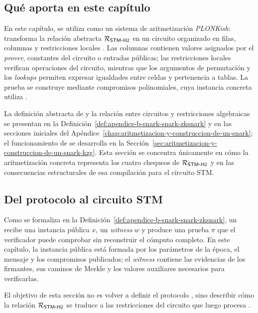 
\subsection{Qué aporta \HaloTwo en este capítulo}
\label{subsec:stm-halo2-y-complejidad-que-aporta-halotwo-en-este-capitulo}

En este capítulo, \HaloTwo se utiliza como un sistema de aritmetización \textit{PLONKish}: transforma la relación abstracta $\mathcal{R}_{\mathsf{STM\mbox{-}H2}}$ en un circuito organizado en filas, columnas y restricciones locales \cite{cryptoeprint:2019/953}. Las columnas contienen valores asignados por el \textit{prover}, constantes del circuito o entradas públicas; las restricciones locales verifican operaciones del circuito, mientras que los argumentos de permutación y los \textit{lookups} permiten expresar igualdades entre celdas y pertenencia a tablas. La prueba se construye mediante compromisos polinomiales, cuya instancia concreta utiliza \KZG.

La definición abstracta de \SNARK y la relación entre circuitos y restricciones algebraicas se presentan en la Definición~\ref{def:apendice-b-snark-snark-zksnark} y en las secciones iniciales del Apéndice~\ref{chap:aritmetizacion-y-construccion-de-un-snark}; el funcionamiento de \KZG se desarrolla en la Sección~\ref{sec:aritmetizacion-y-construccion-de-un-snark-kzg}. Esta sección se concentra únicamente en cómo la aritmetización concreta representa los cuatro chequeos de $\mathcal{R}_{\mathsf{STM\mbox{-}H2}}$ y en las consecuencias estructurales de esa compilación para el circuito STM.

\subsection{Del protocolo \SNARK al circuito STM}
\label{subsec:stm-halo2-y-complejidad-del-protocolo-snark-al-circuito-stm}

Como se formaliza en la Definición~\ref{def:apendice-b-snark-snark-zksnark}, un \SNARK recibe una instancia pública $x$, un \textit{witness} $w$ y produce una prueba $\pi$ que el verificador puede comprobar sin reconstruir el cómputo completo. En este capítulo, la instancia pública está formada por los parámetros de la época, el mensaje y los compromisos publicados; el \textit{witness} contiene las evidencias de los firmantes, sus caminos de Merkle y los valores auxiliares necesarios para verificarlas.

El objetivo de esta sección no es volver a definir el protocolo \SNARK, sino describir cómo la relación $\mathcal{R}_{\mathsf{STM\mbox{-}H2}}$ se traduce a las restricciones del circuito que luego procesa \HaloTwo.

